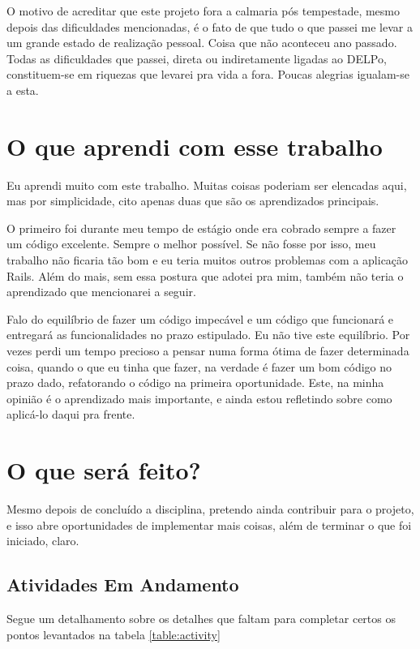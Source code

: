 O motivo de acreditar que este projeto fora a calmaria pós tempestade, mesmo depois das dificuldades mencionadas, é o fato
de que tudo o que passei me levar a um grande estado de realização pessoal. Coisa que não aconteceu ano passado. Todas as
dificuldades que passei, direta ou indiretamente ligadas ao DELPo, constituem-se em riquezas que levarei pra vida a fora.
Poucas alegrias igualam-se a esta.

\section{O que aprendi com esse trabalho}
\label{sec:lessions}

Eu aprendi muito com este trabalho. Muitas coisas poderiam ser elencadas aqui, mas por simplicidade, cito apenas duas que
são os aprendizados principais.

O primeiro foi durante meu tempo de estágio onde era cobrado sempre a fazer um código excelente. Sempre o melhor possível.
Se não fosse por isso, meu trabalho não ficaria tão bom e eu teria muitos outros problemas com a aplicação Rails. Além do
mais, sem essa postura que adotei pra mim, também não teria o aprendizado que mencionarei a seguir.

Falo do equilíbrio de fazer um código impecável e um código que funcionará e entregará as funcionalidades no prazo
estipulado. Eu não tive este equilíbrio. Por vezes perdi um tempo precioso a pensar numa forma ótima de fazer determinada
coisa, quando o que eu tinha que fazer, na verdade é fazer um bom código no prazo dado, refatorando o código na primeira
oportunidade. Este, na minha opinião é o aprendizado mais importante, e ainda estou refletindo sobre como aplicá-lo daqui
pra frente.

\section{O que será feito?}
\label{sec:what-will-be-done}

Mesmo depois de concluído a disciplina, pretendo ainda contribuir para o projeto, e isso abre oportunidades de implementar
mais coisas, além de terminar o que foi iniciado, claro.

\subsection{Atividades Em Andamento}\label{subsec:ongoing}

Segue um detalhamento sobre os detalhes que faltam para completar certos os pontos levantados na tabela \ref{table:activity}

